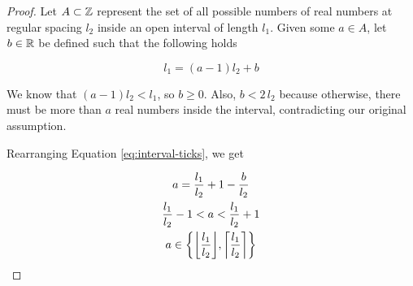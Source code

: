 \begin{proof}
	Let $A \subset \mathbb Z$ represent the set of all possible numbers of real numbers at regular spacing $l_2$ inside an open interval of length $l_1$. Given some $a \in A$, let $b \in \mathbb R$ be defined such that the following holds

	\begin{equation}\label{eq:interval-ticks}
		l_1 = (a - 1) l_2 + b
	\end{equation}

	We know that $(a - 1) l_2 < l_1$, so $b \ge 0$. Also, $b < 2 \, l_2$ because otherwise, there must be more than $a$ real numbers inside the interval, contradicting our original assumption.

	Rearranging Equation \ref{eq:interval-ticks}, we get

	\begin{gather}
		a = \frac{l_1}{l_2} + 1 - \frac{b}{l_2}\\
		\frac{l_1}{l_2} - 1 < a < \frac{l_1}{l_2} + 1\\
		a \in \cbracket{\floor{\frac{l_1}{l_2}}, \ceil{\frac{l_1}{l_2}}}
	\end{gather}
\end{proof}
